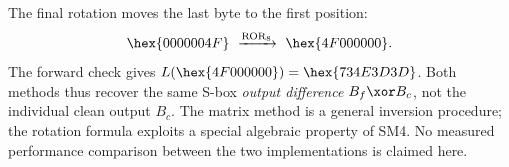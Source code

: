 The final rotation moves the last byte to the first position:
\[
\hex{00 00 00 4F}\ \xrightarrow{\operatorname{ROR}_8}\ \hex{4F 00 00 00}.
\]
The forward check gives $L(\hex{4F000000})=\hex{734E3D3D}$.
Both methods thus recover the same S-box \emph{output difference}
$B_f\xor B_c$, not the individual clean output $B_c$.
The matrix method is a general inversion procedure; the rotation formula
exploits a special algebraic property of SM4. No measured performance comparison
between the two implementations is claimed here.
